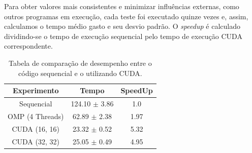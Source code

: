 \documentclass[12pt]{article}
\begin{document}
Para obter valores mais consistentes e minimizar influências externas, como
outros programas em execução, cada teste foi executado quinze vezes e, assim,
calculamos o tempo médio gasto e seu desvio padrão. O \textit{speedup} é
calculado dividindo-se o tempo de execução sequencial pelo tempo de execução
CUDA correspondente.

\begin{table}[ht]
  \centering
  \caption{Tabela de comparação de desempenho entre o código sequencial e o
    utilizando CUDA.}\label{tab:Resultados}
  \vspace{0.3cm}
  \begin{tabular}{||c c c||}
    \hline
    Experimento     & Tempo             & SpeedUp \\ [0.5ex]
    \hline\hline
    Sequencial      & 124.10 $\pm$ 3.86 & 1.0     \\
    \hline
    OMP (4 Threads) & 62.89 $\pm$ 2.38  & 1.97    \\
    \hline
    CUDA (16, 16)    & 23.32 $\pm$ 0.52  & 5.32    \\
    \hline
    CUDA (32, 32)    & 25.05 $\pm$ 0.49  & 4.95    \\
    \hline
  \end{tabular}
\end{table}
\end{document}
